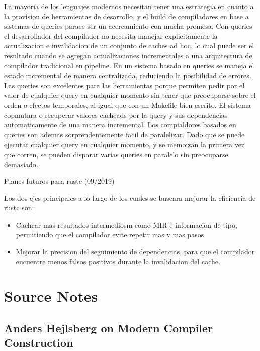 \documentclass[12pt, a4paper]{report}
\begin{document}
La mayoria de los lenguajes modernos necesitan tener una estrategia en cuanto a la provision de herramientas de desarrollo, y el build de compiladores en base a sistemas de queries parace ser un acercamiento con mucha promesa.
Con queries el desarrollador del compilador no necesita manejar explicitamente la actualizacion e invalidacion de un conjunto de caches ad hoc, lo cual puede ser el resultado cuando se agregan actualizaciones incrementales a una arquitectura de compilador tradicional en pipeline.
En un sistema basado en queries se maneja el estado incremental de manera centralizada, reduciendo la posibilidad de errores.
Las queries son excelentes para las herramientas porque permiten pedir por el valor de cualquier query en cualquier momento sin tener que preocuparse sobre el orden o efectos temporales, al igual que con un Makefile bien escrito.
El sistema copmutara o recuperar valores cacheads por la query y sus dependencias automaticamente de una manera incremental.
Los compialdores basados en queries son ademas sorprendentemente facil de paralelizar.
Dado que se puede ejecutar cualquier query en cualquier momento, y se memoizan la primera vez que corren, se pueden disparar varias queries en paralelo sin preocuparse demasiado.
\cite{olle_query_based}

Planes futuros para rustc (09/2019)

Los dos ejes principales a lo largo de los cuales se buscara mejorar la eficiencia de rustc son:
\begin{itemize}[noitemsep]
\item Cachear mas resultados intermediosm como MIR e informacion de tipo, permitiendo que el compilador evite repetir mas y mas pasos.
\item Mejorar la precision del seguimiento de dependencias, para que el compilador encuentre menos falsos positivos durante la invalidacion del cache.
\end{itemize}
\cite{rust_blog_incremental_compilation}

\chapter*{Source Notes}

\section*{Anders Hejlsberg on Modern Compiler Construction}
\cite{hejlsberg_modern_compiler_construction}
\end{document}
